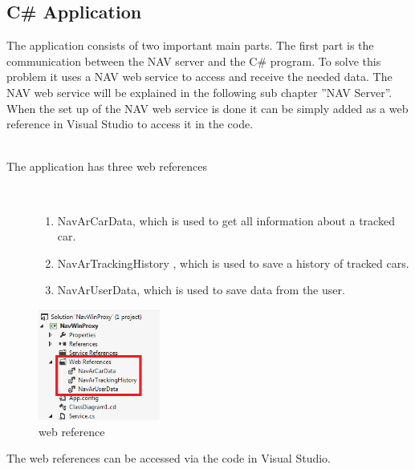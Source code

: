 \subsection{C\# Application}
The application consists of two important main parts. The first part is the communication between the NAV server and the C\# program. To solve this problem it uses a NAV web service to access and receive the needed data. The NAV web service will be explained in the following sub chapter ''NAV Server''. When the set up of the NAV web service is done it can be simply added as a web reference in Visual Studio to access it in the code.
\\\\
\begin{description}
   \item[The application has three web references]~\par
   \begin{enumerate}
      \item NavArCarData, which is used to get all information about a tracked car. 
      \item NavArTrackingHistory , which is used to save a history of tracked cars.
      \item	NavArUserData, which is used to save data from the user. 
   \end{enumerate}
\end{description}

\begin{figure}[htbp]
\centering
\includegraphics[width=40mm,height=\textheight,keepaspectratio]{graphics/webref.png}
\caption{web reference}
\end{figure}
The web references can be accessed via the code in Visual Studio.
\newpage
{}
